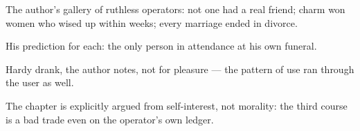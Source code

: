 

\begin{distilled}
  \item The author's gallery of ruthless operators: not one had a real friend; charm won women who wised up within weeks; every marriage ended in divorce.
  \item His prediction for each: the only person in attendance at his own funeral.
  \item Hardy drank, the author notes, not for pleasure --- the pattern of use ran through the user as well.
  \item The chapter is explicitly argued from self-interest, not morality: the third course is a bad trade even on the operator's own ledger.
\end{distilled}
